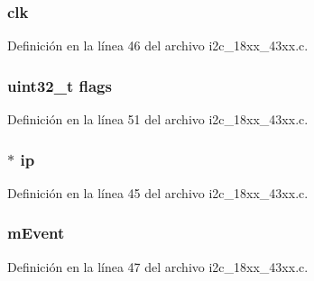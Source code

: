 \subsubsection[{\texorpdfstring{clk}{clk}}]{ clk}\hypertarget{structi2c__interface_a94839755e727dc62b29af549660a5de5}{}\label{structi2c__interface_a94839755e727dc62b29af549660a5de5}


Definición en la línea 46 del archivo i2c\+\_\+18xx\+\_\+43xx.\+c.

\subsubsection[{\texorpdfstring{flags}{flags}}]{\setlength{\rightskip}{0pt plus 5cm}uint32\+\_\+t flags}\hypertarget{structi2c__interface_a773b39d480759f67926cb18ae2219281}{}\label{structi2c__interface_a773b39d480759f67926cb18ae2219281}


Definición en la línea 51 del archivo i2c\+\_\+18xx\+\_\+43xx.\+c.

\subsubsection[{\texorpdfstring{ip}{ip}}]{$\ast$ ip}\hypertarget{structi2c__interface_afa7da7728fbdf79d769f018dd9b31bd6}{}\label{structi2c__interface_afa7da7728fbdf79d769f018dd9b31bd6}


Definición en la línea 45 del archivo i2c\+\_\+18xx\+\_\+43xx.\+c.

\subsubsection[{\texorpdfstring{m\+Event}{mEvent}}]{ m\+Event}\hypertarget{structi2c__interface_af1fb8e01c805d98276dfe11692793583}{}\label{structi2c__interface_af1fb8e01c805d98276dfe11692793583}


Definición en la línea 47 del archivo i2c\+\_\+18xx\+\_\+43xx.\+c.

